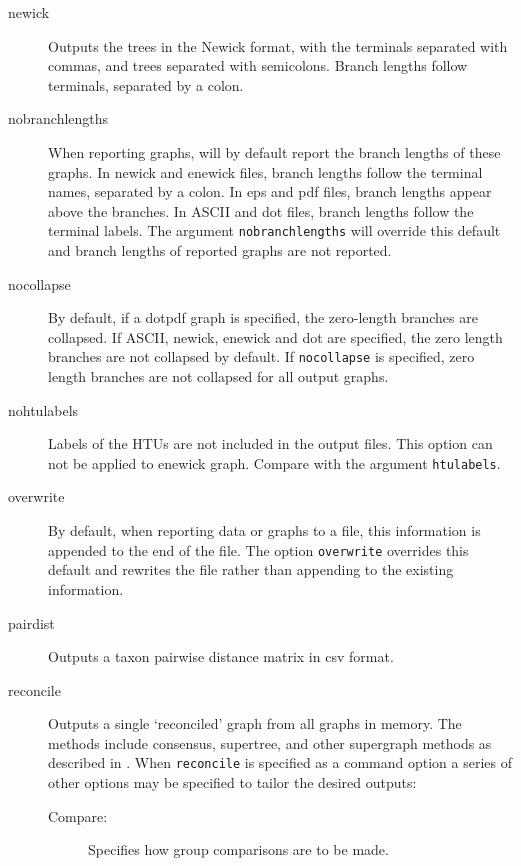 \begin{description}
\begin{description}
		\end{description}
				
		\item[newick] Outputs the trees in the Newick format, with the terminals
		separated with commas, and trees separated with semicolons. Branch
		lengths follow terminals, separated by a colon.
		
		\item[nobranchlengths] When reporting graphs, \phyg will by default 
		report the branch lengths of these graphs. In newick and enewick files, 
		branch lengths follow the terminal names, separated by a colon. In eps 
		and pdf files, branch lengths appear above the branches. In ASCII and 
		dot files, branch lengths follow the terminal labels. The argument
		\texttt{nobranchlengths} will override this default and branch lengths 
		of reported graphs are not reported.
		
		\item[nocollapse] By default, if a dotpdf graph is specified, the zero-length
		branches are collapsed. If ASCII, newick, enewick and dot are specified, 
		the zero length branches are not collapsed by default.  If \texttt{nocollapse}
		is specified, zero length branches are not collapsed for all output graphs.
		
		\item[nohtulabels] Labels of the HTUs are not included in the output files. 
		This option can not be applied to enewick graph. Compare with the argument 
		\texttt{htulabels}.
		
		\item[overwrite] By default, when reporting data or graphs to a file, this 
		information is appended to the end of the file. The option \texttt{overwrite} 
		overrides this default and rewrites the file rather than appending to the 
		existing information.

		\item[pairdist] Outputs a taxon pairwise distance matrix in csv format. 
		
		\item[reconcile] Outputs a single `reconciled' graph from all graphs in 
		memory. The methods include consensus, supertree, and other supergraph 
		methods as described in \cite{Wheeler2012, Wheeler2022}. When \texttt{reconcile} 
		is specified as a command option a series of other options may be specified 
		to tailor the desired outputs:
		
		\begin{description}
			\item [Compare:] Specifies how group comparisons are to be made.
						

\end{description}
\end{description}
